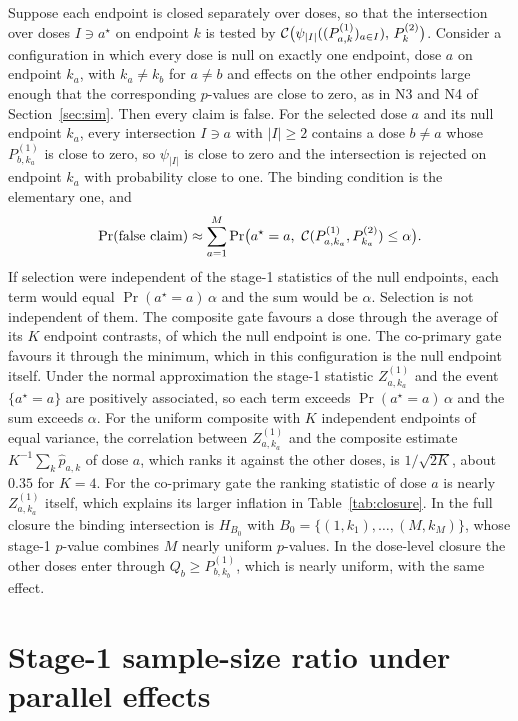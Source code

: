 \begin{appendix}
Suppose each endpoint is closed separately over doses, so that the intersection over doses $I\ni a^\star$ on endpoint $k$ is tested by $\mathcal{C}\big(\psi_{|I|}((P^{(1)}_{a,k})_{a\in I}),\,P^{(2)}_k\big)$. Consider a configuration in which every dose is null on exactly one endpoint, dose $a$ on endpoint $k_a$, with $k_a\ne k_b$ for $a\ne b$ and effects on the other endpoints large enough that the corresponding $p$-values are close to zero, as in N3 and N4 of Section~\ref{sec:sim}. Then every claim is false. For the selected dose $a$ and its null endpoint $k_a$, every intersection $I\ni a$ with $|I|\ge2$ contains a dose $b\ne a$ whose $P^{(1)}_{b,k_a}$ is close to zero, so $\psi_{|I|}$ is close to zero and the intersection is rejected on endpoint $k_a$ with probability close to one. The binding condition is the elementary one, and
\begin{equation*}
\Pr(\text{false claim})\approx\sum_{a=1}^M\Pr\big(a^\star=a,\ \cC(P^{(1)}_{a,k_a},P^{(2)}_{k_a})\le\alpha\big).
\end{equation*}
If selection were independent of the stage-1 statistics of the null endpoints, each term would equal $\Pr(a^\star=a)\,\alpha$ and the sum would be $\alpha$. Selection is not independent of them. The composite gate favours a dose through the average of its $K$ endpoint contrasts, of which the null endpoint is one. The co-primary gate favours it through the minimum, which in this configuration is the null endpoint itself. Under the normal approximation the stage-1 statistic $Z^{(1)}_{a,k_a}$ and the event $\{a^\star=a\}$ are positively associated, so each term exceeds $\Pr(a^\star=a)\,\alpha$ and the sum exceeds $\alpha$. For the uniform composite with $K$ independent endpoints of equal variance, the correlation between $Z^{(1)}_{a,k_a}$ and the composite estimate $K^{-1}\sum_k\hat p_{a,k}$ of dose $a$, which ranks it against the other doses, is $1/\sqrt{2K}$, about $0.35$ for $K=4$. For the co-primary gate the ranking statistic of dose $a$ is nearly $Z^{(1)}_{a,k_a}$ itself, which explains its larger inflation in Table~\ref{tab:closure}. In the full closure the binding intersection is $H_{B_0}$ with $B_0=\{(1,k_1),\dots,(M,k_M)\}$, whose stage-1 $p$-value combines $M$ nearly uniform $p$-values. In the dose-level closure the other doses enter through $Q_b\ge P^{(1)}_{b,k_b}$, which is nearly uniform, with the same effect.

\section{Stage-1 sample-size ratio under parallel effects}\label{app:bracket}


\end{appendix}
